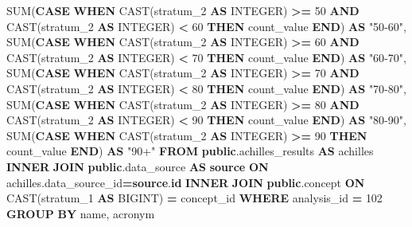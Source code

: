 \documentclass[
]{book}
\newenvironment{Shaded}{\begin{snugshade}}{\end{snugshade}}
\newcommand{\ControlFlowTok}[1]{\textcolor[rgb]{0.13,0.29,0.53}{\textbf{#1}}}
\newcommand{\DataTypeTok}[1]{\textcolor[rgb]{0.13,0.29,0.53}{#1}}
\newcommand{\DecValTok}[1]{\textcolor[rgb]{0.00,0.00,0.81}{#1}}
\newcommand{\FunctionTok}[1]{\textcolor[rgb]{0.00,0.00,0.00}{#1}}
\newcommand{\KeywordTok}[1]{\textcolor[rgb]{0.13,0.29,0.53}{\textbf{#1}}}
\newcommand{\NormalTok}[1]{#1}
\newcommand{\OperatorTok}[1]{\textcolor[rgb]{0.81,0.36,0.00}{\textbf{#1}}}
\newcommand{\OtherTok}[1]{\textcolor[rgb]{0.56,0.35,0.01}{#1}}
\begin{document}
\begin{Shaded}
\begin{Highlighting}[]
       \FunctionTok{SUM}\NormalTok{(}\ControlFlowTok{CASE} \ControlFlowTok{WHEN} \FunctionTok{CAST}\NormalTok{(stratum\_2 }\KeywordTok{AS} \DataTypeTok{INTEGER}\NormalTok{) }\OperatorTok{\textgreater{}=} \DecValTok{50}
         \KeywordTok{AND} \FunctionTok{CAST}\NormalTok{(stratum\_2 }\KeywordTok{AS} \DataTypeTok{INTEGER}\NormalTok{) }\OperatorTok{\textless{}} \DecValTok{60}
         \ControlFlowTok{THEN}\NormalTok{ count\_value }\ControlFlowTok{END}\NormalTok{) }\KeywordTok{AS} \OtherTok{"50{-}60"}\NormalTok{,}
       \FunctionTok{SUM}\NormalTok{(}\ControlFlowTok{CASE} \ControlFlowTok{WHEN} \FunctionTok{CAST}\NormalTok{(stratum\_2 }\KeywordTok{AS} \DataTypeTok{INTEGER}\NormalTok{) }\OperatorTok{\textgreater{}=} \DecValTok{60}
         \KeywordTok{AND} \FunctionTok{CAST}\NormalTok{(stratum\_2 }\KeywordTok{AS} \DataTypeTok{INTEGER}\NormalTok{) }\OperatorTok{\textless{}} \DecValTok{70}
         \ControlFlowTok{THEN}\NormalTok{ count\_value }\ControlFlowTok{END}\NormalTok{) }\KeywordTok{AS} \OtherTok{"60{-}70"}\NormalTok{,}
       \FunctionTok{SUM}\NormalTok{(}\ControlFlowTok{CASE} \ControlFlowTok{WHEN} \FunctionTok{CAST}\NormalTok{(stratum\_2 }\KeywordTok{AS} \DataTypeTok{INTEGER}\NormalTok{) }\OperatorTok{\textgreater{}=} \DecValTok{70}
         \KeywordTok{AND} \FunctionTok{CAST}\NormalTok{(stratum\_2 }\KeywordTok{AS} \DataTypeTok{INTEGER}\NormalTok{) }\OperatorTok{\textless{}} \DecValTok{80}
         \ControlFlowTok{THEN}\NormalTok{ count\_value }\ControlFlowTok{END}\NormalTok{) }\KeywordTok{AS} \OtherTok{"70{-}80"}\NormalTok{,}
       \FunctionTok{SUM}\NormalTok{(}\ControlFlowTok{CASE} \ControlFlowTok{WHEN} \FunctionTok{CAST}\NormalTok{(stratum\_2 }\KeywordTok{AS} \DataTypeTok{INTEGER}\NormalTok{) }\OperatorTok{\textgreater{}=} \DecValTok{80}
         \KeywordTok{AND} \FunctionTok{CAST}\NormalTok{(stratum\_2 }\KeywordTok{AS} \DataTypeTok{INTEGER}\NormalTok{) }\OperatorTok{\textless{}} \DecValTok{90}
         \ControlFlowTok{THEN}\NormalTok{ count\_value }\ControlFlowTok{END}\NormalTok{) }\KeywordTok{AS} \OtherTok{"80{-}90"}\NormalTok{,}
       \FunctionTok{SUM}\NormalTok{(}\ControlFlowTok{CASE} \ControlFlowTok{WHEN} \FunctionTok{CAST}\NormalTok{(stratum\_2 }\KeywordTok{AS} \DataTypeTok{INTEGER}\NormalTok{) }\OperatorTok{\textgreater{}=} \DecValTok{90}
         \ControlFlowTok{THEN}\NormalTok{ count\_value }\ControlFlowTok{END}\NormalTok{) }\KeywordTok{AS} \OtherTok{"90+"}
\KeywordTok{FROM} \KeywordTok{public}\NormalTok{.achilles\_results }\KeywordTok{AS}\NormalTok{ achilles}
\KeywordTok{INNER} \KeywordTok{JOIN} \KeywordTok{public}\NormalTok{.data\_source }\KeywordTok{AS} \KeywordTok{source}
  \KeywordTok{ON}\NormalTok{ achilles.data\_source\_id}\OperatorTok{=}\KeywordTok{source}\NormalTok{.}\KeywordTok{id}
\KeywordTok{INNER} \KeywordTok{JOIN} \KeywordTok{public}\NormalTok{.concept}
  \KeywordTok{ON} \FunctionTok{CAST}\NormalTok{(stratum\_1 }\KeywordTok{AS}\NormalTok{ BIGINT) }\OperatorTok{=}\NormalTok{ concept\_id}
\KeywordTok{WHERE}\NormalTok{ analysis\_id }\OperatorTok{=} \DecValTok{102}
\KeywordTok{GROUP} \KeywordTok{BY}\NormalTok{ name, acronym}
\end{Highlighting}
\end{Shaded}
\end{document}
